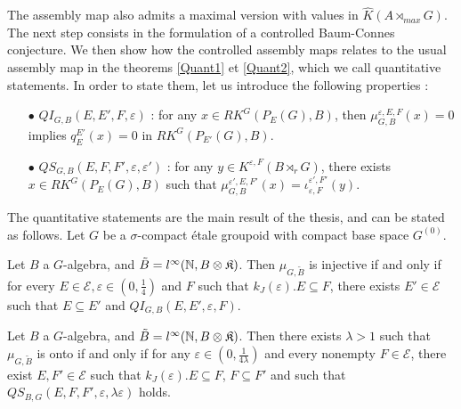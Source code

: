 The assembly map also admits a maximal version with values in $\hat K(A\rtimes_{max} G)$. \\ %

The next step consists in the formulation of a controlled Baum-Connes conjecture. We then show how the controlled assembly maps relates to the usual assembly map in the theorems \ref{Quant1} et \ref{Quant2}, which we call quantitative statements. In order to state them, let us introduce the following properties :\\
\begin{itemize}
\item[$\bullet$] $QI_{G,B}(E,E',F,\varepsilon)$ : for any $x\in RK^G(P_E(G), B )$, then $\mu^{\varepsilon,E,F}_{G,B}(x) = 0$ implies $q_E^{E'}(x)=0$ in $RK^G(P_{E'}(G),B)$.
\item[$\bullet$] $QS_{G,B}(E,F,F',\varepsilon,\varepsilon')$ : for any $y\in K^{\varepsilon,F}(B\rtimes_r G)$, there exists $x\in RK^G(P_E(G),B)$ such that $\mu^{\varepsilon',E,F'}_{G,B}(x)=\iota_{\varepsilon,F}^{\varepsilon',F'}(y)$.\\
\end{itemize} 

The quantitative statements are the main result of the thesis, and can be stated as follows. Let $G$ be a $\sigma$-compact étale groupoid with compact base space $G^{(0)}$.

\begin{thm}
Let $B$ a $G$-algebra, and $\tilde B = l^\infty(\mathbb N,B\otimes \mathfrak K)$. Then $\mu_{G,\tilde B}$ is injective if and only if for every $E\in\mathcal E,\varepsilon\in(0,\frac{1}{4})$ and $F$ such that $k_J(\varepsilon).E\subseteq F$, there exists $E' \in\mathcal E$ such that $E\subseteq E'$ and $QI_{G,B}(E,E',\varepsilon,F)$. 
\end{thm}

\begin{thm}
Let $B$ a $G$-algebra, and $\tilde B = l^\infty(\mathbb N,B\otimes \mathfrak K)$. Then there exists $\lambda>1$ such that $\mu_{G,\tilde B}$ is onto if and only if for any $\varepsilon\in ( 0 ,\frac{1}{4\lambda})$ and every nonempty $F\in\mathcal E$, there exist $E,F'\in\mathcal E$ such that  $k_J(\varepsilon) .E \subseteq F$, $F\subseteq F'$ and such that $QS_{B,G}(E,F,F',\varepsilon,\lambda\varepsilon)$ holds.
\end{thm}

